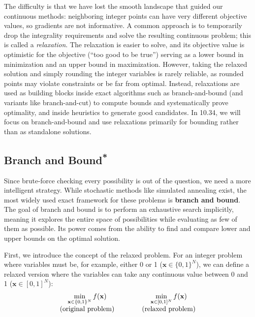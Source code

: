 The difficulty is that we have lost the smooth landscape that guided our continuous methods: neighboring integer points can have very different objective values, so gradients are not informative. A common approach is to temporarily drop the integrality requirements and solve the resulting continuous problem; this is called a \emph{relaxation}. The relaxation is easier to solve, and its objective value is optimistic for the objective (``too good to be true'') serving as a lower bound in minimization and an upper bound in maximization. However, taking the relaxed solution and simply rounding the integer variables is rarely reliable, as rounded points may violate constraints or be far from optimal. Instead, relaxations are used as building blocks inside exact algorithms such as branch-and-bound (and variants like branch-and-cut) to compute bounds and systematically prove optimality, and inside heuristics to generate good candidates. In 10.34, we will focus on branch-and-bound and use relaxations primarily for bounding rather than as standalone solutions.

\subsection{\texorpdfstring{Branch and Bound\textsuperscript{*}}{Branch and Bound}}
\label{sec:branch-and-bound}

Since brute-force checking every possibility is out of the question, we need a more intelligent strategy. While stochastic methods like simulated annealing exist, the most widely used exact framework for these problems is \textbf{branch and bound}. The goal of branch and bound is to perform an exhaustive search implicitly, meaning it explores the entire space of possibilities while evaluating as few of them as possible. Its power comes from the ability to find and compare lower and upper bounds on the optimal solution.

First, we introduce the concept of the relaxed problem. For an integer problem where variables must be, for example, either 0 or 1 ($\mathbf{x} \in \{0, 1\}^N$), we can define a relaxed version where the variables can take any continuous value between 0 and 1 ($\mathbf{x} \in [0, 1]^N$):
\begin{equation}
    { \everymath={\displaystyle}
    \begin{array}{c@{\qquad\qquad}c}
        \min_{\mathbf{x} \in \{0, 1\}^N} f(\mathbf{x}) & \min_{\mathbf{x} \in [0, 1]^N} f(\mathbf{x}) \\[6pt]
        \text{(original problem)} & \text{(relaxed problem)}
    \end{array}
    }
\end{equation}

